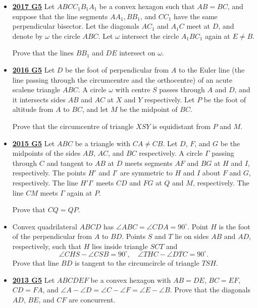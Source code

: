\documentclass[11pt]{scrartcl}
\begin{document}
\begin{itemize}[leftmargin=*]
Show that the circumcircle of the triangle $\Theta$ is tangent to $\Omega$.
\item \href{https://artofproblemsolving.com/community/c6h1671278p10632312}{\textbf{2017 G5}} Let $ABCC_1B_1A_1$ be a convex hexagon such that $AB=BC$, and suppose that the line segments $AA_1, BB_1$, and $CC_1$ have the same perpendicular bisector. Let the diagonals $AC_1$ and $A_1C$ meet at $D$, and denote by $\omega$ the circle $ABC$. Let $\omega$ intersect the circle $A_1BC_1$ again at $E \neq B$. 

Prove that the lines $BB_1$ and $DE$ intersect on $\omega$.


\item \href{https://artofproblemsolving.com/community/c6h1480717p8639313}{\textbf{2016 G5}} Let $D$ be the foot of perpendicular from $A$ to the Euler line (the line passing through the circumcentre and the orthocentre) of an acute scalene triangle $ABC$. A circle $\omega$ with centre $S$ passes through $A$ and $D$, and it intersects sides $AB$ and $AC$ at $X$ and $Y$ respectively. Let $P$ be the foot of altitude from $A$ to $BC$, and let $M$ be the midpoint of $BC$. 

Prove that the circumcentre of triangle $XSY$ is equidistant from $P$ and $M$.
\item \href{https://artofproblemsolving.com/community/c6h1268908p6622796}{\textbf{2015 G5}} 	Let $ABC$ be a triangle with $CA \neq CB$. Let $D$, $F$, and $G$ be the midpoints of the sides $AB$, $AC$, and $BC$ respectively. A circle $\Gamma$ passing through $C$ and tangent to $AB$ at $D$ meets segments $AF$ and $BG$ at $H$ and $I$, respectively. The points $H'$ and $I'$ are symmetric to $H$ and $I$ about $F$ and $G$, respectively. The line $H'I'$ meets $CD$ and $FG$ at $Q$ and $M$, respectively. The line $CM$ meets $\Gamma$ again at $P$.

Prove that $CQ = QP$.
\item {}  Convex quadrilateral $ABCD$ has $\angle ABC = \angle CDA = 90^{\circ}$. Point $H$ is the foot of the perpendicular from $A$ to $BD$. Points $S$ and $T$ lie on sides $AB$ and $AD$, respectively, such that $H$ lies inside triangle $SCT$ and\[
\angle CHS - \angle CSB = 90^{\circ}, \quad \angle THC - \angle DTC = 90^{\circ}. \]Prove that line $BD$ is tangent to the circumcircle of triangle $TSH$.
\item \href{https://artofproblemsolving.com/community/c6h597241p3544093}{\textbf{2013 G5}} Let $ABCDEF$ be a convex hexagon with $AB=DE$, $BC=EF$, $CD=FA$, and $\angle A-\angle D = \angle C -\angle F = \angle E -\angle B$. Prove that the diagonals $AD$, $BE$, and $CF$ are concurrent.


\end{itemize}
\end{document}
